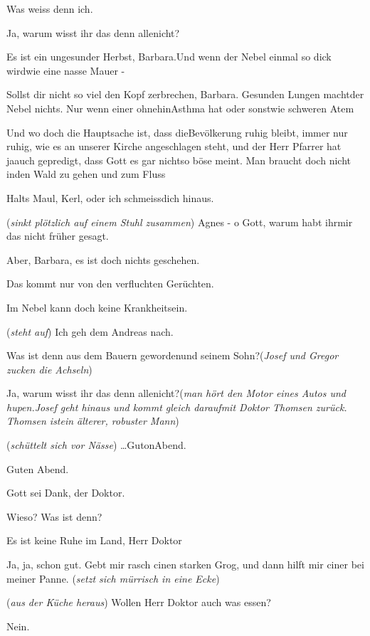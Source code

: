 \documentclass[
	final,
	a4paper,
	ngerman,
	mpinclude = true, %
	twoside = true,
	open = right,
	cleardoublepage = plain,
	DIV = 13,
	BCOR = 1cm,
	titlepage = firstiscover,
	]{scrbook}
\newcommand{\direction}[1]{(\textit{#1})}
\newcommand{\thecharacter}[1]{\textup{\textsc{#1}}\xspace}
\newcommand{\theBarbara}{\thecharacter{Barbara}}
\newcommand{\theJosef}{\thecharacter{Josef}}
\newcommand{\theGregor}{\thecharacter{Gregor}}
\newcommand{\theJan}{\thecharacter{Jan}}
\newcommand{\theLuise}{\thecharacter{Luise}}
\newcommand{\theThomsen}{\thecharacter{Doktor Thomsen}}
\newcommand{\character}[1]{\item[#1]}
\newcommand{\Barbara}{\character{\theBarbara}}
\newcommand{\Josef}{\character{\theJosef}}
\newcommand{\Gregor}{\character{\theGregor}}
\newcommand{\Jan}{\character{\theJan}}
\newcommand{\Luise}{\character{\theLuise}}
\newcommand{\Thomsen}{\character{\theThomsen}}
\begin{document}
\begin{play}
\Gregor
Was weiss denn ich.

\Barbara
Ja, warum wisst ihr das denn allenicht?

\Luise
Es ist ein ungesunder Herbst, Barbara.Und wenn der Nebel einmal so dick wirdwie eine nasse Mauer -

\Josef
Sollst dir nicht so viel den Kopf zerbrechen, Barbara. Gesunden Lungen machtder Nebel nichts. Nur wenn einer ohnehinAsthma hat oder sonstwie schweren Atem

\Jan
Und wo doch die Hauptsache ist, dass dieBevölkerung ruhig bleibt, immer nur ruhig, wie es an unserer Kirche angeschlagen steht, und der Herr Pfarrer hat jaauch gepredigt, dass Gott es gar nichtso böse meint. Man braucht doch nicht inden Wald zu gehen und zum Fluss

\Josef
Halts Maul, Kerl, oder ich schmeissdich hinaus.

\Barbara
\direction{sinkt plötzlich auf einem Stuhl zusammen} Agnes - o Gott, warum habt ihrmir das nicht früher gesagt.

\Luise
Aber, Barbara, es ist doch nichts geschehen.

\Josef
Das kommt nur von den verfluchten Gerüchten.

\Gregor
Im Nebel kann doch keine Krankheitsein.

\Jan
\direction{steht auf} Ich geh dem Andreas nach.

\Barbara
Was ist denn aus dem Bauern gewordenund seinem Sohn?\direction{Josef und Gregor zucken die Achseln}

\Barbara
Ja, warum wisst ihr das denn allenicht?\direction{man hört den Motor eines Autos und hupen.Josef geht hinaus und kommt gleich daraufmit Doktor Thomsen zurück. Thomsen istein älterer, robuster Mann}

\Thomsen
\direction{schüttelt sich vor Nässe} \ldots GutonAbend.

\Gregor
Guten Abend.

\Luise
Gott sei Dank, der Doktor.

\Thomsen
Wieso? Was ist denn?

\Josef
Es ist keine Ruhe im Land, Herr Doktor

\Thomsen
Ja, ja, schon gut. Gebt mir rasch cinen starken Grog, und dann hilft mir ciner bei meiner Panne. \direction{setzt sich mürrisch in eine Ecke}

\Josef
\direction{aus der Küche heraus} Wollen Herr Doktor auch was essen?

\Thomsen
Nein.


\end{play}
\end{document}
